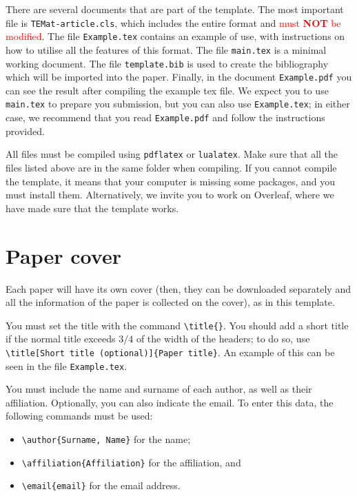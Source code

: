 \documentclass[babel-main=english]{TEMat-article}
\begin{document}
There are several documents that are part of the template.
The most important file is \verb+TEMat-article.cls+, which includes the entire format and \textcolor{red}{must \textbf{NOT} be modified}.
The file \verb+Example.tex+ contains an example of use, with instructions on how to utilise all the features of this format.
The file \verb+main.tex+ is a minimal working document.
The file \verb+template.bib+ is used to create the bibliography which will be imported into the paper.
Finally, in the document \verb+Example.pdf+ you can see the result after compiling the example tex file.
We expect you to use \verb+main.tex+ to prepare you submission, but you can also use \verb+Example.tex+; in either case, we recommend that you read \verb+Example.pdf+ and follow the instructions provided.

All files must be compiled using \verb+pdflatex+ or \verb+lualatex+.
Make sure that all the files listed above are in the same folder when compiling.
If you cannot compile the template, it means that your computer is missing some packages, and you must install them.
Alternatively, we invite you to work on Overleaf, where we have made sure that the template works.

\section{Paper cover}

Each paper will have its own cover (then, they can be downloaded separately and all the information of the paper is collected on the cover), as in this template.

You must set the title with the command \verb+\title{}+.
You should add a short title if the normal title exceeds $3/4$ of the width of the headers; to do so, use \verb+\title[Short title (optional)]{Paper title}+.
An example of this can be seen in the file \verb+Example.tex+.

You must include the name and surname of each author, as well as their affiliation. Optionally, you can also indicate the email.
To enter this data, the following commands must be used:
\begin{itemize}
\item \verb+\author{Surname, Name}+ for the name;
\item \verb+\affiliation{Affiliation}+ for the affiliation, and
\item \verb+\email{email}+ for the email address.
\end{itemize}
\end{document}
